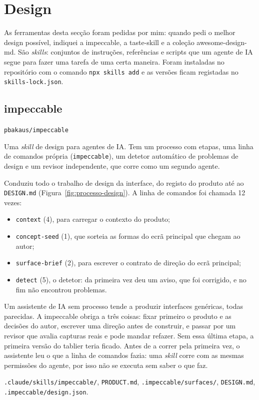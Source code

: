 \documentclass[a4paper,12pt]{article}
\newenvironment{ficha}[2]{%
  \par\needspace{7\baselineskip}\medskip\noindent{\large\bfseries #1}\hfill{\small\color{gray!70!black}#2}\par\nopagebreak\smallskip
  \begin{description}[leftmargin=3.1cm,labelwidth=2.8cm,labelsep=0.3cm,font=\normalfont\bfseries\small,itemsep=2pt,topsep=2pt,before=\raggedright]
}{\end{description}\medskip}
\begin{document}
\section{Design}

As ferramentas desta secção foram pedidas por mim: quando pedi o melhor design possível, indiquei a impeccable, a taste-skill e a coleção awesome-design-md. São \textit{skills}: conjuntos de instruções, referências e scripts que um agente de IA segue para fazer uma tarefa de uma certa maneira. Foram instaladas no repositório com o comando \texttt{npx skills add} e as versões ficam registadas no \texttt{skills-lock.json}.

\subsection{impeccable}
\label{sec:impeccable}

\begin{ficha}{impeccable}{\texttt{pbakaus/impeccable}}
  \item[O que é] Uma \textit{skill} de design para agentes de IA. Tem um processo com etapas, uma linha de comandos própria (\texttt{impeccable}), um detetor automático de problemas de design e um revisor independente, que corre como um segundo agente.
  \item[Para que serviu] Conduziu todo o trabalho de design da interface, do registo do produto até ao \texttt{DESIGN.md} (Figura~\ref{fig:processo-design}). A linha de comandos foi chamada 12 vezes:
  \begin{itemize}
    \item \texttt{context} (4), para carregar o contexto do produto;
    \item \texttt{concept-seed} (1), que sorteia as formas do ecrã principal que chegam ao autor;
    \item \texttt{surface-brief} (2), para escrever o contrato de direção do ecrã principal;
    \item \texttt{detect} (5), o detetor: da primeira vez deu um aviso, que foi corrigido, e no fim não encontrou problemas.
  \end{itemize}
  \item[Porquê] Um assistente de IA sem processo tende a produzir interfaces genéricas, todas parecidas. A impeccable obriga a três coisas: fixar primeiro o produto e as decisões do autor, escrever uma direção antes de construir, e passar por um revisor que avalia capturas reais e pode mandar refazer. Sem essa última etapa, a primeira versão do tablier teria ficado. Antes de a correr pela primeira vez, o assistente leu o que a linha de comandos fazia: uma \textit{skill} corre com as mesmas permissões do agente, por isso não se executa sem saber o que faz.
  \item[Onde está] \texttt{.claude/skills/impeccable/}, \texttt{PRODUCT.md}, \texttt{.impeccable/surfaces/}, \texttt{DESIGN.md}, \texttt{.impeccable/design.json}.
\end{ficha}
\end{document}
